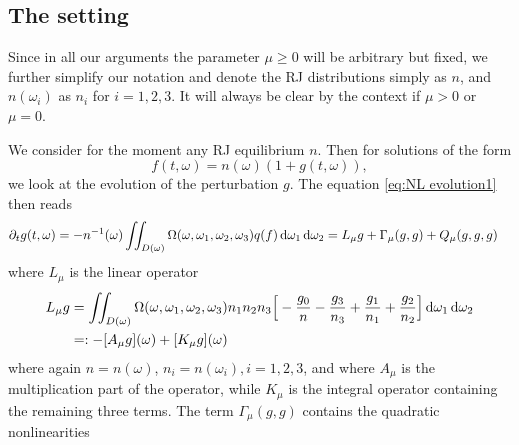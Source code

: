 \documentclass[reqno,11pt,letterpaper]{amsart}
\numberwithin{equation}{section}
\newcommand{\dd}{\, {\rm d}}
\begin{document}
\subsection{The setting} Since in all our arguments the parameter $\mu \ge 0$ will be arbitrary but fixed, we further simplify our notation and denote the RJ distributions simply as $n$, and $n(\omega _i)$ as $n_i$ for $i=1, 2, 3$. It will always be clear by the context if $\mu >0$ or $\mu =0$. 

We consider for the moment any RJ equilibrium $n$. Then for solutions of the form
\begin{equation} \label{eq:perturbat_setting}
    f(t,\omega)= n (\omega) (1+ g(t,\omega)), 
\end{equation}
we look at the evolution of the perturbation $g$. The equation \eqref{eq:NL evolution1} then reads
\begin{equation}\label{eq:NL evolution}
\begin{split}
    \partial_t g(t,\omega) &= -n^{-1}(\omega)
     \iint_{D(\omega)}\Omega (\omega , \omega _1, \omega_2, \omega _3) q(f) \dd \omega_1 \dd \omega_2   = L_\mu g + \Gamma_\mu(g,g) + Q_\mu(g,g,g)
 \end{split}
\end{equation}
 where $L_\mu $ is the linear operator
\begin{equation} \label{eq: A_mu+K_mu}
\begin{split} 
L_\mu g & = \iint_{D(\omega)} \Omega (\omega , \omega _1, \omega _2, \omega _3) n_1n_2n_3 \Big[-\frac{g_0}{n}  - \frac{g_3}{n_3} + \frac{g_1}{n_1} + \frac{g_2}{n_2}   
\Big] \dd \omega_1 \dd \omega_2 \\
&=: -[A_\mu g](\omega) + [K_\mu g](\omega)
\end{split} 
\end{equation} 
where again $n=n(\omega )$, $n_i=n(\omega_i), i=1, 2, 3$, and 
where $A_\mu$ is the multiplication part of the operator, while $K_\mu$ is the integral operator containing the remaining three terms. The term  $ \Gamma_\mu (g,g)$ contains the quadratic nonlinearities
\end{document}
